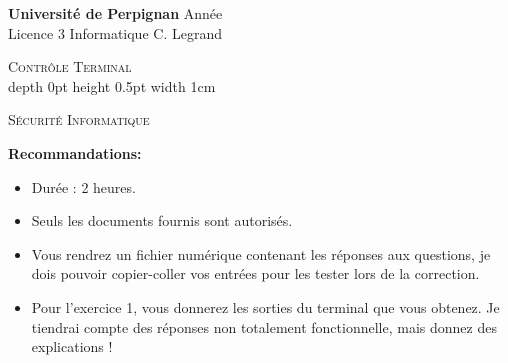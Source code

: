 \documentclass[a4paper,9pt]{article}
\theoremstyle{plain}
\theoremstyle{definition}
\begin{document}
\hbox{}
\noindent \textbf{Université de Perpignan} \hfill  Année \the\year \\
Licence 3 Informatique \hfill C. Legrand \\

\begin{center}
  {  {\scshape \large Contrôle Terminal  } \\
    \vrule depth 0pt height 0.5pt width 1cm
    \medskip
    
{\scshape    S\'ecurit\'e Informatique}  \\
}
\end{center}
\hbox{}

\bigskip

\textbf{Recommandations:}
\begin{itemize}
  \item Durée : 2 heures.
  \item Seuls les documents fournis sont autorisés. 
\item Vous rendrez un fichier numérique contenant les réponses aux questions, je dois pouvoir copier-coller vos entrées pour les tester lors de la correction. 

\item Pour l'exercice 1, vous donnerez les sorties du terminal que vous obtenez. Je tiendrai compte des réponses non totalement fonctionnelle, mais donnez des explications !

\end{itemize}
\end{document}
